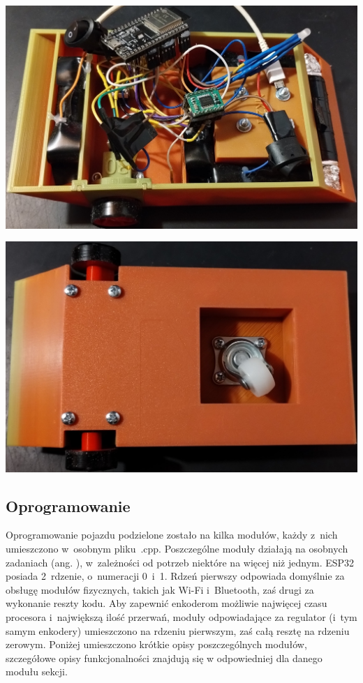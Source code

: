 \begin{center}
  \includegraphics[scale=0.21]{images/Pojazd_Gora.jpg}
  \label{fig:pojazdgora}
\end{center}

\begin{center}
  \includegraphics[scale=0.23]{images/Pojazd_Dol.jpg}
  \label{fig:pojazddol}
\end{center}

\subsection*{Oprogramowanie}
Oprogramowanie pojazdu podzielone zostało na kilka modułów, każdy z~nich umieszczono w~osobnym pliku~.cpp. Poszczególne moduły działają na osobnych zadaniach (ang. ), w~zależności od potrzeb niektóre na więcej niż jednym. ESP32 posiada 2~rdzenie, o~numeracji 0~i~1. Rdzeń pierwszy odpowiada domyślnie za obsługę modułów fizycznych, takich jak Wi-Fi i~Bluetooth, zaś drugi za wykonanie reszty kodu. Aby zapewnić enkoderom możliwie najwięcej czasu procesora i~największą ilość przerwań, moduły odpowiadające za regulator (i~tym samym enkodery) umieszczono na rdzeniu pierwszym, zaś całą resztę na rdzeniu zerowym. Poniżej umieszczono krótkie opisy poszczególnych modułów, szczegółowe opisy funkcjonalności znajdują się w odpowiedniej dla danego modułu sekcji.

